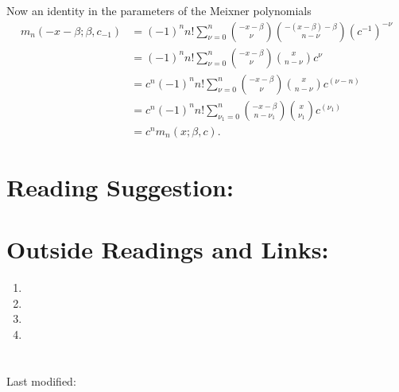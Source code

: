 \documentclass[12pt]{article}
\begin{document}
\begin{solution}
    Now an identity in the parameters of the Meixner polynomials
    \begin{align*}
        m_n(-x-\beta; \beta, c_{-1}) &= (-1)^n n!  \sum_{\nu=0}^n \binom
        {-x-\beta}{\nu} \binom{-(x-\beta)-\beta}{n-\nu} (c^{-1})^{-\nu}
        \\
        &= (-1)^n n!  \sum_{\nu=0}^n \binom{-x-\beta}{\nu} \binom{x}{n-\nu}
        c^\nu \\
        &= c^{n} (-1)^n n!  \sum_{\nu=0}^n \binom{-x-\beta}{\nu} \binom{x}
        {n-\nu} c^(\nu-n) \\
        &= c^{n} (-1)^n n!  \sum_{\nu_1=0}^n \binom{-x-\beta}{n-\nu_1}
        \binom{x}{\nu_1} c^(\nu_1) \\
        &= c^n m_n(x;\beta,c).
    \end{align*}

\end{solution}

\hr

\section*{Reading Suggestion:}




\hr

\section*{Outside Readings and Links:}
\begin{enumerate}
    \item
    \item
    \item
    \item
\end{enumerate}

\hr

\section*{\solutionsname} \loadSolutions

\mydisclaim \myfooter

Last modified:  \flastmod
\end{document}
